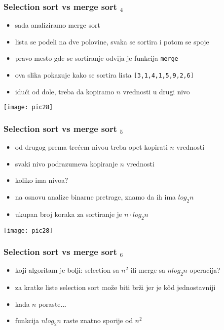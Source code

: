\documentclass[utf8,compress,aspectratio=169]{beamer}
\begin{document}
\begin{frame}[fragile]
  \frametitle{Selection sort vs merge sort $_4$}
  \begin{itemize}
    \item sada analiziramo merge sort
    \item lista se podeli na dve polovine, svaka se sortira i potom se spoje
    \item pravo mesto gde se sortiranje odvija je funkcija \texttt{merge}
    \item ova slika pokazuje kako se sortira lista \texttt{[3,1,4,1,5,9,2,6]}
    \item idući od dole, treba da kopiramo $n$ vrednosti u drugi nivo
  \end{itemize}
\begin{center}
  \texttt{[image: pic28]}
\end{center}
\end{frame}

\begin{frame}[fragile]
  \frametitle{Selection sort vs merge sort $_5$}
  \begin{itemize}
    \item od drugog prema trećem nivou treba opet kopirati $n$ vrednosti
    \item svaki nivo podrazumeva kopiranje $n$ vrednosti
    \item koliko ima nivoa?
    \item na osnovu analize binarne pretrage, znamo da ih ima $log_2 n$
    \item ukupan broj koraka za sortiranje je $n\cdot log_2 n$
  \end{itemize}
\begin{center}
  \texttt{[image: pic28]}
\end{center}
\end{frame}

\begin{frame}[fragile]
  \frametitle{Selection sort vs merge sort $_6$}
  \begin{itemize}
    \item koji algoritam je bolji: selection sa $n^2$ ili merge sa $n log_2 n$ operacija?
    \item za kratke liste selection sort može biti brži jer je kôd jednostavniji
    \item kada $n$ poraste...
    \item funkcija $n log_2 n$ raste znatno sporije od $n^2$
  \end{itemize}
\end{frame}
\end{document}
